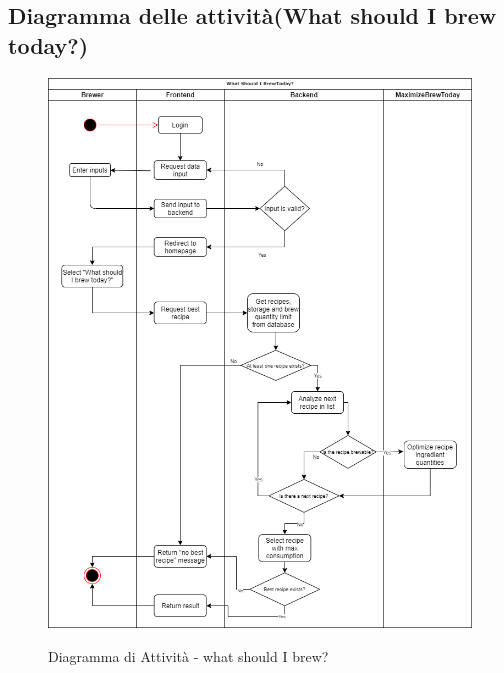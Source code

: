 \documentclass{article}
\begin{document}
\subsection{Diagramma delle attività(What should I brew today?)}
\begin{figure}[h!]
\centering
\includegraphics[scale=0.45]{new Activity Diagram.png}
\label{fig:Diagramma di Attività - what should I brew?}
\caption{Diagramma di Attività - what should I brew?}
\end{figure}
\clearpage
\end{document}
